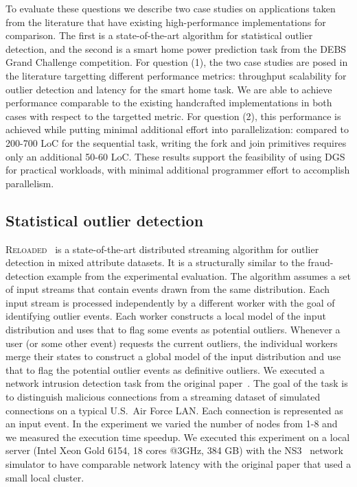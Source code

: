 To evaluate these questions we describe two case studies on applications taken from the literature that have existing high-performance implementations for comparison. The first is a state-of-the-art algorithm for statistical outlier detection, and the second is a smart home power prediction task from the DEBS Grand Challenge competition.
For question (1),
the two case studies are posed in the literature targetting different performance metrics: throughput scalability for outlier detection and latency for the smart home task.
We are able to achieve performance comparable to the existing handcrafted implementations in both cases with respect to the targetted metric.
For question (2), this performance is achieved while putting minimal additional effort into parallelization: compared to 200-700 LoC for the sequential task, writing the fork and join primitives requires only an additional 50-60 LoC.
These results support the feasibility of using DGS for practical workloads, with minimal additional programmer effort to accomplish parallelism.

\subsection{Statistical outlier detection}
\label{dgs:ssec:outlier-detection}

\textsc{Reloaded}~\cite{otey2006fast} is a state-of-the-art distributed
streaming algorithm for outlier detection in mixed attribute
datasets. It is a structurally similar
to the fraud-detection example from the experimental evaluation.
The algorithm assumes a set of input streams that
contain events drawn from the same distribution. Each input stream is
processed independently by a different worker with the goal of
identifying outlier events. Each worker constructs a local model of
the input distribution and uses that to flag some events as potential
outliers. Whenever a user (or some other event) requests the current
outliers, the individual workers merge their states to construct a
global model of the input distribution and use that to flag the
potential outlier events as definitive outliers.
We executed a network
intrusion detection task from the original
paper~\cite{kddcup1999dataset}.
The goal of the task is to distinguish malicious connections from a
streaming dataset of simulated connections on a typical U.S.~Air Force
LAN. Each connection is represented as an input event. In the
experiment we varied the number of nodes from 1-8 and we measured the
execution time speedup. We executed this experiment on a local server
(Intel Xeon Gold 6154, 18 cores @3GHz, 384 GB) with the NS3~\cite{carneiro2010ns3} network simulator
to have comparable network latency with the original paper that used a small local cluster.

